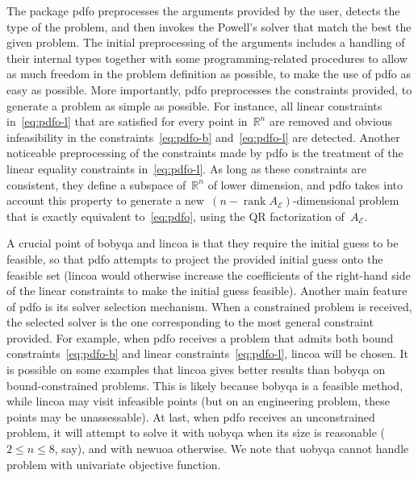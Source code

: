 \documentclass[
    smallextended,  %
    draft,          %
]{svjour3}
\DeclareMathOperator\rank{rank}
\newcommand{\R}{\mathbb{R}}
\newcommand{\aeq}{A_{\scriptscriptstyle\mathcal{E}}}
\begin{document}
The package \gls{pdfo} preprocesses the arguments provided by the user, detects the type of the problem, and then invokes the Powell's solver that match the best the given problem.
The initial preprocessing of the arguments includes a handling of their internal types together with some programming-related procedures to allow as much freedom in the problem definition as possible, to make the use of \gls{pdfo} as easy as possible.
More importantly, \gls{pdfo} preprocesses the constraints provided, to generate a problem as simple as possible.
For instance, all linear constraints in~\eqref{eq:pdfo-l} that are satisfied for every point in~$\R^n$ are removed and obvious infeasibility in the constraints~\eqref{eq:pdfo-b} and~\eqref{eq:pdfo-l} are detected.
Another noticeable preprocessing of the constraints made by \gls{pdfo} is the treatment of the linear equality constraints in~\eqref{eq:pdfo-l}.
As long as these constraints are consistent, they define a subspace of~$\R^n$ of lower dimension, and \gls{pdfo} takes into account this property to generate a new~$(n - \rank \aeq)$-dimensional problem that is exactly equivalent to~\eqref{eq:pdfo}, using the QR factorization of~$\aeq$.

A crucial point of \gls{bobyqa} and \gls{lincoa} is that they require the initial guess to be feasible, so that \gls{pdfo} attempts to project the provided initial guess onto the feasible set (\gls{lincoa} would otherwise increase the coefficients of the right-hand side of the linear constraints to make the initial guess feasible).
Another main feature of \gls{pdfo} is its solver selection mechanism.
When a constrained problem is received, the selected solver is the one corresponding to the most general constraint provided.
For example, when \gls{pdfo} receives a problem that admits both bound constraints~\eqref{eq:pdfo-b} and linear constraints~\eqref{eq:pdfo-l}, \gls{lincoa} will be chosen.
It is possible on some examples that \gls{lincoa} gives better results than \gls{bobyqa} on bound-constrained problems.
This is likely because \gls{bobyqa} is a feasible method, while \gls{lincoa} may visit infeasible points (but on an engineering problem, these points may be unassessable).
At last, when \gls{pdfo} receives an unconstrained problem, it will attempt to solve it with \gls{uobyqa} when its size is reasonable ($2 \le n \le 8$, say), and with \gls{newuoa} otherwise.
We note that \gls{uobyqa} cannot handle problem with univariate objective function.
\end{document}
